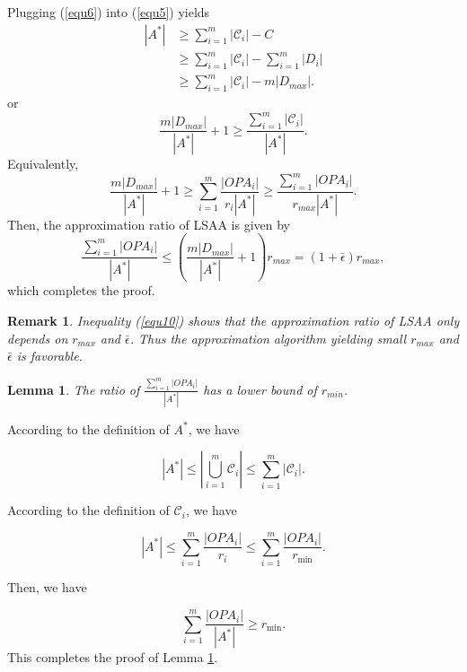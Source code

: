 \documentclass[journal]{IEEEtran}
\newtheorem{lemma}{Lemma}
\newtheorem{remark}{Remark}
\begin{document}
\begin{IEEEproof}
Plugging (\ref{equ6}) into (\ref{equ5}) yields
\begin{equation}\label{equ7}
    \begin{split}
      |A^*| &\geq\sum\limits_{i=1}^m|\mathcal{C}_i|-C  \\
        & \geq\sum\limits_{i=1}^m|\mathcal{C}_i|-\sum\limits_{i=1}^m|D_i|\\
        & \geq\sum\limits_{i=1}^m|\mathcal{C}_i|-m|D_{max}|.
    \end{split}
\end{equation}
or
\begin{equation}\label{euq8}
    \frac{m|D_{max}|}{|A^*|}+1\geq\frac{\sum\limits_{i=1}^m|\mathcal{C}_i|}{|A^*|}.
\end{equation}
Equivalently,
\begin{equation}\label{equ9}
    \frac{m|D_{max}|}{|A^*|}+1\geq\sum\limits_{i=1}^m\frac{|OPA_i|}{r_i|A^*|}\geq\frac{\sum\limits_{i=1}^m|OPA_i|}{r_{max}|A^*|}.
\end{equation}
Then, the approximation ratio of LSAA is given by
\begin{equation}\label{equ10}
    \frac{\sum\limits_{i=1}^m|OPA_i|}{|A^*|}\leq(\frac{m|D_{max}|}{|A^*|}+1)r_{max}=(1+\bar{\epsilon})r_{max},
\end{equation}
which completes the proof.
\end{IEEEproof}

\begin{remark} Inequality (\ref{equ10}) shows that the approximation ratio of LSAA only depends on $r_{max}$ and $\bar{\epsilon}$. Thus the approximation algorithm yielding small $r_{max}$ and $\bar{\epsilon}$ is favorable.
\end{remark}
\begin{lemma}\label{lemma2}
The ratio of $\frac{\sum\limits_{i=1}^m\left|OPA_i\right|}{|A^*|}$ has a lower bound of $r_{min}$.
\end{lemma}

\begin{IEEEproof}
According to the definition of $A^*$, we have

\begin{equation}\label{equ11}
\left|A^*\right|\leq \left|\bigcup\limits_{i=1}^m\mathcal{C}_i\right|\leq \sum\limits_{i=1}^m\left|\mathcal{C}_i\right|.
\end{equation}

According to the definition of $\mathcal{C}_i$, we have

\begin{equation}\label{equ12}
\left| {A^{*}} \right| \le \sum\limits_{i = 1}^m {\frac{{\left| {OP{A_i}} \right|}}{{{r_i}}}}  \le \sum\limits_{i = 1}^m {\frac{{\left| {OP{A_i}} \right|}}{{{r_{\min }}}}}.
\end{equation}

Then, we have

\begin{equation}\label{equ13}
\sum\limits_{i = 1}^m {\frac{{\left| {OP{A_i}} \right|}}{{\left| {A^{*}} \right|}}}  \ge {r_{\min }}.
\end{equation}
This completes the proof of Lemma \ref{lemma2}.
\end{IEEEproof}
\end{document}
